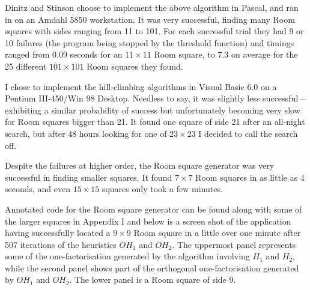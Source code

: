 Dinitz and Stinson choose to implement the above algorithm in Pascal, and ran in on an Amdahl 5850 workstation.
It was very successful, finding many Room squares with sides ranging from 11 to 101.
For each successful trial they had 9 or 10 failures (the program being stopped by the threshold function) and timings ranged from 0.09 seconds for an $11 \times 11$ Room square, to 7.3 on average for the 25 different $101 \times 101$ Room squares they found.

I chose to implement the hill-climbing algorithms in Visual Basic 6.0 on a Pentium III-450/Win 98 Desktop.
Needless to say, it was slightly less successful – exhibiting a similar probability of success but unfortunately becoming very slow for Room squares bigger than 21.
It found one square of side 21 after an all-night search, but after 48 hours looking for one of $23 \times 23$ I decided to call the search off.

Despite the failures at higher order, the Room square generator was very successful in finding smaller squares.
It found $7 \times 7$ Room squares in as little as 4 seconds, and even $15 \times 15$ squares only took a few minutes.

Annotated code for the Room square generator can be found along with some of the larger squares in Appendix I and below is a screen shot of the application having successfully located a $9 \times 9$ Room square in a little over one minute after 507 iterations of the heuristics $OH_1$ and $OH_2$.
The uppermost panel represents some of the one-factorisation generated by the algorithm involving $H_1$ and $H_2$, while the second panel shows part of the orthogonal one-factorisation generated by $OH_1$ and $OH_2$.
The lower panel is a Room square of side 9.
